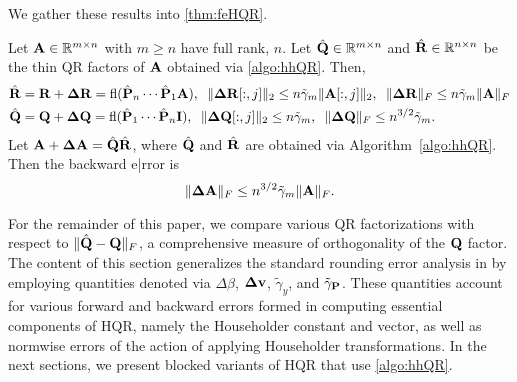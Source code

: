 We gather these results into \cref{thm:feHQR}.
\begin{theorem}
	\label{thm:feHQR}
	Let $\mathbf{A}\in\mathbb{R}^{m\times n}$ with $m\geq n$ have full rank, $n$. 
	Let $\hat{\mathbf{Q}}\in\mathbb{R}^{m\times n}$ and $\hat{\mathbf{R}}\in\mathbb{R}^{n\times n}$ be the thin QR factors of $\mathbf{A}$ obtained via \cref{algo:hhQR}.
	Then,
	\begin{align*}
	\hat{\mathbf{R}} &= \mathbf{R} + \mathbf{\Delta R} = \mathrm{fl}(\hat{\mathbf{P}}_n\cdots\hat{\mathbf{P}}_1 \mathbf{A}),\;\; \|\mathbf{\Delta R}[:,j]\|_2\leq n\tilde{\gamma}_{m} \|\mathbf{A}[:,j]\|_2,\;\; \|\mathbf{\Delta R}\|_F\leq n\tilde{\gamma}_{m} \|\mathbf{A}\|_F\\
	\hat{\mathbf{Q}} &= \mathbf{Q} + \mathbf{\Delta Q} = \mathrm{fl}(\hat{\mathbf{P}}_1\cdots\hat{\mathbf{P}}_n \mathbf{I}),\;\; \|\mathbf{\Delta Q}[:,j]\|_2\leq n\tilde{\gamma}_{m},\;\; \|\mathbf{\Delta Q}\|_F \leq n^{3/2} \tilde{\gamma}_{m}.
	\end{align*}
	Let $\mathbf{A}+\mathbf{\Delta A} = \hat{\mathbf{Q}}\hat{\mathbf{R}}$, where $\hat{\mathbf{Q}}$ and $\hat{\mathbf{R}}$ are obtained via Algorithm~\ref{algo:hhQR}.
	Then the backward e|rror is
	\begin{equation}
	\|\mathbf{\Delta A}\|_F \leq n^{3/2}\tilde{\gamma}_{m}\|\mathbf{A}\|_F.
	\end{equation}
\end{theorem}
For the remainder of this paper, we compare various QR factorizations with respect to $\|\hat{\mathbf{Q}}-\mathbf{Q}\|_F$, a comprehensive measure of orthogonality of the $\mathbf{Q}$ factor.
The content of this section generalizes the standard rounding error analysis in \cite{Higham2002} by employing quantities denoted via $\Delta \beta$, $\mathbf{\Delta v}$, $\tilde{\gamma}_y$, and $\tilde{\gamma}_{\mathbf{P}}$. 
These quantities account for various forward and backward errors formed in computing essential components of HQR, namely the Householder constant and vector, as well as normwise errors of the action of applying Householder transformations.
In the next sections, we present blocked variants of HQR that use \cref{algo:hhQR}.